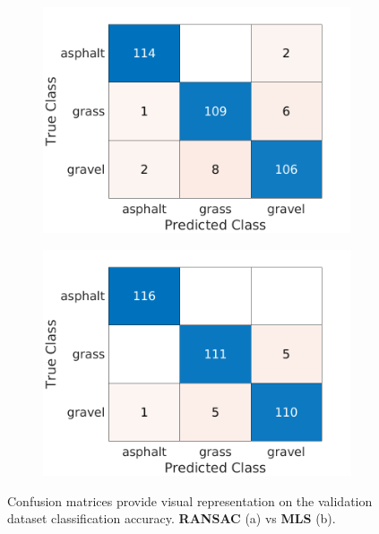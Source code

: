 \documentclass[numbered,pdftex]{ohio-etd}
\begin{document}
{{		\begin{figure}[H]
			\centering
			\begin{subfigure}{0.45\textwidth}
				\centering
				\includegraphics[width=1.0\linewidth]{Defense_Images/c2_vali_conf_ransac}
				\caption[Validation Confusion Matrices - RANSAC]{}
				\label{fig:c2_vali_conf_ransac}
			\end{subfigure}
			\begin{subfigure}{0.45\textwidth}
				\centering
				\includegraphics[width=1.0\linewidth]{Defense_Images/c2_vali_confmat_mls}
				\caption[Validation Confusion Matrices - MLS]{}
				\label{fig:c2_vali_confmat_mls}
			\end{subfigure}
			\caption[Validation Confusion Matrices - RANSAC/MLS]{Confusion matrices provide visual representation on the validation dataset classification accuracy. \textbf{RANSAC} (a) vs \textbf{MLS} (b).}
			\label{fig:vali_confmat_ransac_mls}
		\end{figure}
		
}}
\end{document}

